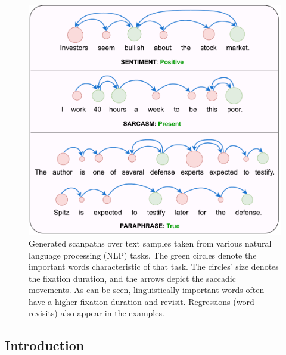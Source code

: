 \begin{figure}[!t]
    \includegraphics[width=1\columnwidth]{images/scanpath_sample_7.pdf}
    \caption{\small Generated scanpaths over text samples taken from various natural language processing (NLP) tasks. The green circles denote the important words characteristic of that task. The circles' size denotes the fixation duration, and the arrows depict the saccadic movements. As can be seen, linguistically important words often have a higher fixation duration and revisit. Regressions (word revisits) also appear in the examples. }
    \label{fig:scanpaths_for_NLP}
\end{figure}


\subsection{Introduction}

